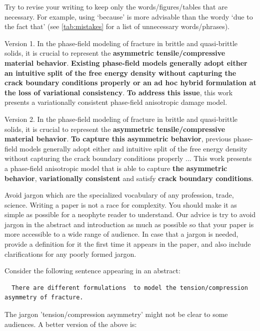 \documentclass[authoryear,3p,times,preprint,review,fleqn]{elsarticle}
\numberwithin{equation}{section}
\theoremstyle{remark}
\begin{document}
Try to revise your writing to keep only the words/figures/tables that are necessary. For example, using `because' is more advisable than the wordy `due to the fact that' (see \cref{tab:mistakes} for a list of unnecessary words/phrases).\\

\begin{MyBox}[width=0.48\textwidth,nobeforeafter,label={version1}]
{Version 1.}
{
In the phase-field modeling of fracture in brittle and quasi-brittle solids, it is crucial to represent the \textbf{asymmetric tensile/compressive material behavior}. \textbf{Existing phase-field models generally adopt either an intuitive split of the free energy density without capturing the crack boundary conditions properly or an ad hoc hybrid formulation at the loss of variational consistency}. \textbf{To address this issue}, this work presents a variationally consistent phase-field anisotropic damage model.}
\end{MyBox}\hfill
\begin{MyBox}[width=0.48\textwidth,nobeforeafter,label={version2}]
{Version 2.}
{
In the phase-field modeling of fracture in brittle and quasi-brittle solids, it is crucial to represent the \textbf{asymmetric tensile/compressive material behavior}. \textbf{To capture this asymmetric behavior}, previous phase-field models  generally adopt either and intuitive split of the free energy density without capturing the crack boundary conditions properly ... This work presents a phase-field anisotropic model that is able to capture \textbf{the asymmetric behavior}, \textbf{variationally consistent} and satisfy \textbf{crack boundary conditions}.}
\end{MyBox}

Avoid jargon which are the specialized vocabulary of any profession, trade, science.  Writing a paper is not a race for complexity. You should make it as simple as possible for a neophyte reader to understand.
Our advice is try to avoid jargon in the abstract and introduction as much as possible so that your paper is more accessible to a wide range of audience. In case that a jargon is needed, provide a definition for it the first time it appears in the paper, and also include clarifications for any poorly formed jargon.

Consider the following sentence appearing in an abstract:

 \begin{verbatim}
  There are different formulations  to model the tension/compression asymmetry of fracture.
 \end{verbatim}
The jargon 'tension/compression asymmetry' might not be clear to some audiences. A better version of the above is:
\end{document}

